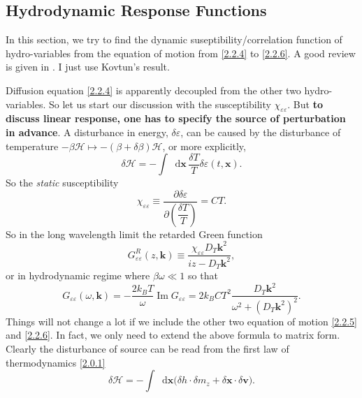 \documentclass[10pt,nofootinbib]{revtex4}
\newcommand*\dd{\mathop{}\!\mathrm{d}}
\begin{document}
	\subsection{Hydrodynamic Response Functions}
		In this section, we try to find the dynamic suseptibility/correlation function of hydro-variables from the equation of motion from \eqref{2.2.4} to \eqref{2.2.6}. A good review is given in \cite{kovtun2012lectures}. I just use Kovtun's result.\par
		Diffusion equation \eqref{2.2.4} is apparently decoupled from the other two hydro-variables. So let us start our discussion with the susceptibility $\chi_{\varepsilon \varepsilon}$. But \textbf{to discuss linear response, one has to specify the source of perturbation in advance}. A disturbance in energy, $\delta \varepsilon$, can be caused by the disturbance of temperature $-\beta\mathcal{H}\mapsto-(\beta+\delta\beta)\mathcal{H}$, or more explicitly,
		\begin{equation}\label{2.3.1}
			\delta\mathcal{H}=-\int\dd\bm{x}\,\dfrac{\delta T}{T}\delta\varepsilon(t,\bm{x}).
		\end{equation}
		So the \emph{static} susceptibility
		\begin{equation}\label{2.3.2}
			\chi_{\varepsilon \varepsilon}\equiv\dfrac{\partial\delta\varepsilon}{\partial\left(\dfrac{\delta T}{T}\right)}=CT.
		\end{equation}
		So in the long wavelength limit the retarded Green function \cite{kovtun2012lectures,chaikin2000principles}
		\begin{equation}\label{2.3.3}
			G_{\varepsilon\varepsilon}^R(z,\bm{k})\equiv\dfrac{\chi_{\varepsilon \varepsilon}D_T\bm{k}^2}{iz-D_T\bm{k}^2},
		\end{equation}
		or in hydrodynamic regime where $\beta\omega\ll1$ so that
		\begin{equation}\label{2.3.4}
			G_{\varepsilon \varepsilon}(\omega,\bm{k})=-\dfrac{2k_BT}{\omega}\mathop{\mathrm{Im}}G_{\varepsilon \varepsilon}=2k_BCT^2\dfrac{D_T\bm{k}^2}{\omega^2+(D_T\bm{k}^2)^2}.
		\end{equation}
		\indent Things will not change a lot if we include the other two equation of motion \eqref{2.2.5} and \eqref{2.2.6}. In fact, we only need to extend the above formula to matrix form. Clearly the disturbance of source can be read from the first law of thermodynamics \eqref{2.0.1}
		\begin{equation}\label{2.3.5}
			\delta\mathcal{H}=-\int\dd\bm{x}\bigg(\delta h\cdot\delta m_z+\delta\bm{x}\cdot\delta\bm{v}\bigg).
		\end{equation}
\end{document}
